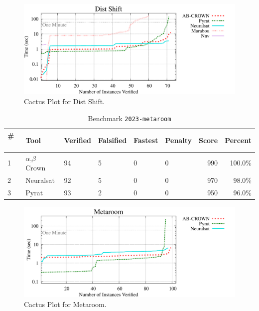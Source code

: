 \begin{figure}[h]
\centerline{\includegraphics[width=\textwidth]{cactus/2023_dist_shift.pdf}}
\caption{Cactus Plot for Dist Shift.}
\label{fig:quantPic}
\end{figure}



\begin{table}[h]
\begin{center}
\caption{Benchmark \texttt{2023-metaroom}} \label{tab:cat_{cat}}
{\setlength{\tabcolsep}{2pt}
\begin{tabular}[h]{@{}llllllrr@{}}
\toprule
\textbf{\# ~} & \textbf{Tool} & \textbf{Verified} & \textbf{Falsified} & \textbf{Fastest} & \textbf{Penalty} & \textbf{Score} & \textbf{Percent}\\
\midrule
1 & $\alpha$,$\beta$ Crown & 94 & 5 & 0 & 0 & 990 & 100.0\% \\
2 & Neuralsat & 92 & 5 & 0 & 0 & 970 & 98.0\% \\
3 & Pyrat & 93 & 2 & 0 & 0 & 950 & 96.0\% \\
\bottomrule
\end{tabular}
}
\end{center}
\end{table}



\begin{figure}[h]
\centerline{\includegraphics[width=\textwidth]{cactus/2023_metaroom.pdf}}
\caption{Cactus Plot for Metaroom.}
\label{fig:quantPic}
\end{figure}


